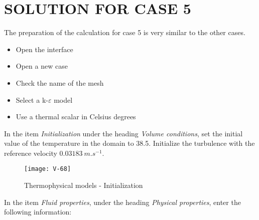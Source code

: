 %
%
%
%
%
%
%
\section{SOLUTION FOR CASE 5}
The preparation of the calculation for case 5 is very similar to the other cases.
\begin{itemize}
        \item Open the \CS interface
        \item Open a new case
        \item Check the name of the mesh
        \item Select a k-$\varepsilon$ model
        \item Use a thermal scalar in Celsius degrees
\end{itemize}

In the item {\itshape Initialization} under the heading {\itshape Volume conditions}, set the initial value of the temperature
in the domain to 38.5\degresC. Initialize the turbulence with the reference
velocity $0.03183\ m.s^{-1}$.

\begin{figure}[h!]
\begin{center}
\texttt{[image: V-68]}
\caption{Thermophysical models - Initialization}
\label{fig1_e5}
\end{center}
\end{figure}


\newpage
In the item {\itshape Fluid properties}, under the heading {\itshape Physical
properties}, enter the following information:


